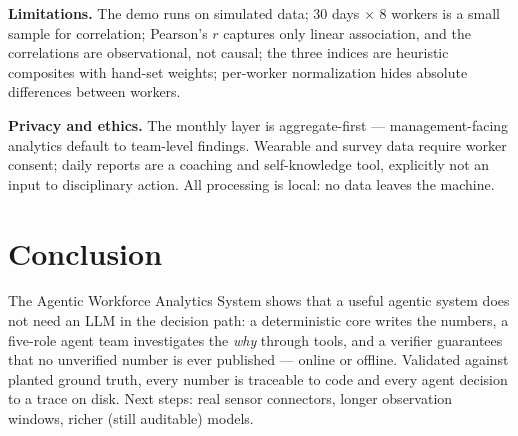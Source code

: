 \documentclass[11pt,a4paper]{article}
\begin{document}
\textbf{Limitations.} The demo runs on simulated data; $30$ days $\times$
$8$ workers is a small sample for correlation; Pearson's $r$ captures only
linear association, and the correlations are observational, not causal; the
three indices are heuristic composites with hand-set weights; per-worker
normalization hides absolute differences between workers.

\textbf{Privacy and ethics.} The monthly layer is aggregate-first ---
management-facing analytics default to team-level findings. Wearable and
survey data require worker consent; daily reports are a coaching and
self-knowledge tool, explicitly not an input to disciplinary action. All
processing is local: no data leaves the machine.

\section{Conclusion}
The Agentic Workforce Analytics System shows that a useful agentic system does not need an LLM in the
decision path: a deterministic core writes the numbers, a five-role agent
team investigates the \emph{why} through tools, and a verifier guarantees
that no unverified number is ever published --- online or offline.
Validated against planted ground truth, every number is traceable to code
and every agent decision to a trace on disk. Next steps: real sensor
connectors, longer observation windows, richer (still auditable) models.
\end{document}
